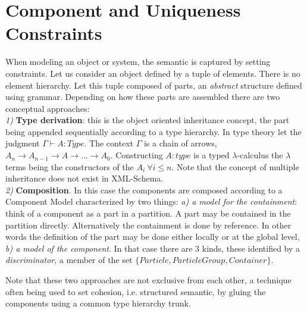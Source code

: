 \section{Component and Uniqueness Constraints} 
When modeling an object or system, the semantic is captured by setting constraints. Let us consider an object defined by a tuple of elements. There is no element hierarchy. Let this tuple composed of parts, an {\it abstract} structure defined using grammar. Depending on how these parts are assembled there are two conceptual approaches:\\
{\it 1)} {\bf Type derivation}: this is the object oriented inheritance concept, the part being appended sequentially according to a type hierarchy. In type theory let the judgment $\Gamma \vdash A\!:\!Type$. The context $\Gamma$ is  a chain of arrows, $A_n\rightarrow A_{n-1}\rightarrow A\rightarrow ...\rightarrow A_0$. Constructing $A\!:\!type$ is a typed $\lambda$-calculus the $\lambda$ terms being the constructors of the $A_i ~\forall i\le n$. Note that the concept of multiple inheritance does not exist in XML-Schema.\\
{\it 2)} {\bf Composition}. In this case the components are composed according to a Component Model characterized by two things: {\it a) a model for the containment}: think of a component as a part in a partition. A part may be contained in the partition directly. Alternatively the containment is done by reference. In other words the definition of the part may be done either locally or at the global level, {\it b) a model of the component}. In that case there are 3 kinds, these identified by a {\it discriminator}, a member of the set $\{Particle,ParticleGroup, Container\}$. 

Note that these two approaches are not exclusive from each other, a technique often being used to set cohesion, i.e. structured semantic, by gluing the components using a common type hierarchy trunk.

